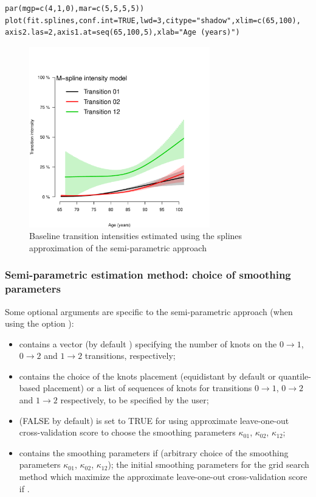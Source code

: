 \documentclass[article]{jss}
\begin{document}
\lstset{language=R,numbers=none}
\begin{lstlisting}
par(mgp=c(4,1,0),mar=c(5,5,5,5))
plot(fit.splines,conf.int=TRUE,lwd=3,citype="shadow",xlim=c(65,100), axis2.las=2,axis1.at=seq(65,100,5),xlab="Age (years)")
\end{lstlisting}

\begin{figure}[htb]
\centering
\includegraphics[width=0.7\textwidth]{transition-intensities-paq-splines.pdf}
\caption{\label{fig:alpha_splines}Baseline transition intensities estimated using the splines approximation of the semi-parametric approach}
\end{figure}


\subsubsection{Semi-parametric estimation method: choice of smoothing parameters}
\label{sec-5-3-1}

Some optional arguments are specific to the semi-parametric approach
(when using the option ):

\begin{itemize}
\item {} contains a vector (by default )
specifying the number of knots on the \(0 \rightarrow 1\), \(0
  \rightarrow 2\) and \(1 \rightarrow 2\) transitions, respectively;
\item {} contains the choice of the knots placement (equidistant
by default or quantile-based placement) or a list of sequences of
knots for transitions \(0 \rightarrow 1\), \(0 \rightarrow 2\) and \(1
  \rightarrow 2\) respectively, to be specified by the user;
\item {} (FALSE by default) is set to TRUE for using approximate
leave-one-out cross-validation score to choose the smoothing
parameters \(\kappa_{01}\), \(\kappa_{02}\), \(\kappa_{12}\);
\item {} contains the smoothing parameters if 
(arbitrary choice of the smoothing parameters \(\kappa_{01}\),
\(\kappa_{02}\), \(\kappa_{12}\)); the initial smoothing parameters for
the grid search method which maximize the approximate leave-one-out
cross-validation score if .
\end{itemize}
\end{document}
